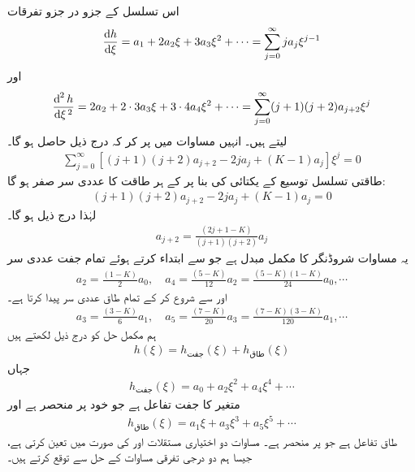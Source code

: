  اس تسلسل کے جزو در جزو تفرقات
\begin{align*}
\frac{\dif{h}}{\dif{\xi}}=a_{1}+2a_{2}\xi+3a_{3}\xi^{2}+\cdots =\sum_{j=0}^{\infty}ja_{j}\xi^{j-1}
\end{align*}
اور
\begin{align*}
\frac{\dif^{\,2}{h}}{\dif{\xi^{\,2}}}=2a_{2}+2\cdot 3a_{3}\xi+3\cdot 4a_{4}\xi^{2}+\cdots =\sum_{j=0}^{\infty}(j+1)(j+2)a_{j+2}\xi^{j}
\end{align*}
لیتے ہیں۔ انہیں مساوات  میں پر کر کہ درج ذیل حاصل ہو گا۔
\begin{align}
\sum_{j=0}^{\infty}[(j+1)(j+2)a_{j+2}-2ja_{j}+(K-1)a_{j}]\xi^{j}=0
\end{align}
طاقتی تسلسل توسیع کے یکتائی کی بنا پر  کے ہر طاقت کا عددی سر صفر ہو گا:
\begin{align*}
(j+1)(j+2)a_{j+2}-2ja_{j}+(K-1)a_{j}=0
\end{align*}
لہٰذا درج ذیل ہو گا۔
\begin{align}\label{مساوات_شروڈنگر_کلیہ_توالی_الف}
a_{j+2}=\frac{(2j+1-K)}{(j+1)(j+2)}a_{j}
\end{align}
یہ  مساوات شروڈنگر کا مکمل مبدل ہے جو  سے ابتداء کرتے ہوئے تمام جفت عددی سر
\begin{align*}
a_{2}=\frac{(1-K)}{2}a_{0}, \quad a_{4}=\frac{(5-K)}{12}a_{2}=\frac{(5-K)(1-K)}{24}a_{0},\cdots
\end{align*}
اور  سے شروع کر کے تمام طاق عددی سر پیدا کرتا ہے۔
\begin{align*}
a_{3}=\frac{(3-K)}{6}a_{1},\quad a_{5}=\frac{(7-K)}{20}a_{3}=\frac{(7-K)(3-K)}{120}a_{1},\cdots
\end{align*}
ہم مکمل حل کو درج ذیل لکھتے ہیں
\begin{align}\label{مساوات_شروڈنگر_کلیہ_توالی_ب}
h(\xi)=h_{\text{جفت}}(\xi)+h_{\text{طاق}}(\xi)
\end{align}
جہاں 
\begin{align*}
h_{\text{جفت}}(\xi)=a_{0}+a_{2}\xi^{2}+a_{4}\xi^{4}+\cdots
\end{align*}
متغیر  کا جفت تفاعل ہے جو خود  پر منحصر ہے اور 
\begin{align*}
h_{\text{طاق}}(\xi)=a_{1}\xi+a_{3}\xi^{3}+a_{5}\xi^{5}+\cdots
\end{align*}
طاق تفاعل ہے جو  پر منحصر ہے۔ مساوات  دو اختیاری مستقلات 
اور  کی صورت میں  تعین کرتی ہے، جیسا ہم دو درجی تفرقی مساوات کے حل سے توقع کرتے ہیں۔

